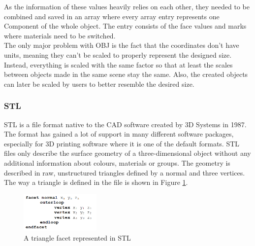\begin{table}[htbp]
	\centering 
	\caption[MTL Types]{Example types in MTL format}
	\label{tab:MTLTypes}
\end{table}

As the information of these values heavily relies on each other, they needed to be combined and saved in an array where every array entry represents one Component of the whole object. The entry consists of the face values and marks where materials need to be switched.\\
The only major problem with OBJ is the fact that the coordinates don't have units, meaning they can't be scaled to properly represent the designed size. Instead, everything is scaled with the same factor so that at least the scales between objects made in the same scene stay the same. Also, the created objects can later be scaled by users to better resemble the desired size.

\subsubsection{STL}
STL is a file format native to the \acs{CAD} software created by 3D Systems in 1987\cite{bib:STL}. The format has gained a lot of support in many different software packages, especially for 3D printing software where it is one of the default formats. STL files only describe the surface geometry of a three-dimensional object without any additional information about colours, materials or groups. The geometry is described in raw, unstructured triangles defined by a normal and three vertices. The way a triangle is defined in the file is shown in Figure \ref{fig:STLFormat}. 
\begin{figure}[htpb]
	\centering
	\includegraphics[width=0.35\textwidth]{fig/STLFormat.png}
	\caption[STL Triangle facet]{A triangle facet represented in STL\protect}
	\label{fig:STLFormat}
\end{figure}

